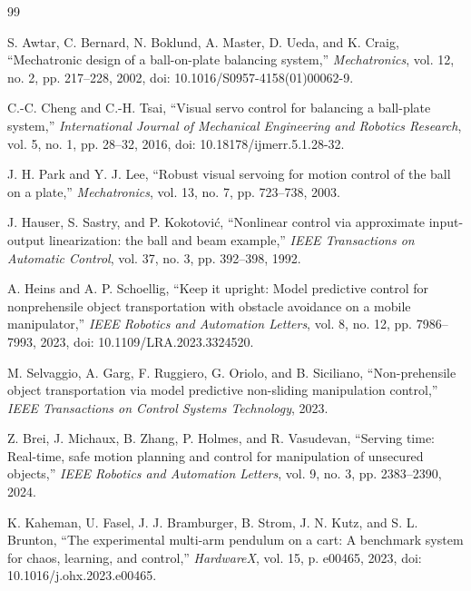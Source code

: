 \documentclass[11pt,letterpaper]{article}
\begin{document}
\begin{thebibliography}{99}

S. Awtar, C. Bernard, N. Boklund, A. Master, D. Ueda, and K. Craig,
``Mechatronic design of a ball-on-plate balancing system,''
\textit{Mechatronics}, vol. 12, no. 2, pp. 217--228, 2002,
doi: 10.1016/S0957-4158(01)00062-9.

C.-C. Cheng and C.-H. Tsai,
``Visual servo control for balancing a ball-plate system,''
\textit{International Journal of Mechanical Engineering and Robotics Research},
vol. 5, no. 1, pp. 28--32, 2016, doi: 10.18178/ijmerr.5.1.28-32.

J. H. Park and Y. J. Lee,
``Robust visual servoing for motion control of the ball on a plate,''
\textit{Mechatronics}, vol. 13, no. 7, pp. 723--738, 2003.

J. Hauser, S. Sastry, and P. Kokotovi\'c,
``Nonlinear control via approximate input-output linearization: the ball
and beam example,''
\textit{IEEE Transactions on Automatic Control}, vol. 37, no. 3,
pp. 392--398, 1992.

A. Heins and A. P. Schoellig,
``Keep it upright: Model predictive control for nonprehensile object
transportation with obstacle avoidance on a mobile manipulator,''
\textit{IEEE Robotics and Automation Letters}, vol. 8, no. 12,
pp. 7986--7993, 2023, doi: 10.1109/LRA.2023.3324520.

M. Selvaggio, A. Garg, F. Ruggiero, G. Oriolo, and B. Siciliano,
``Non-prehensile object transportation via model predictive
non-sliding manipulation control,''
\textit{IEEE Transactions on Control Systems Technology}, 2023.

Z. Brei, J. Michaux, B. Zhang, P. Holmes, and R. Vasudevan,
``Serving time: Real-time, safe motion planning and control for
manipulation of unsecured objects,''
\textit{IEEE Robotics and Automation Letters}, vol. 9, no. 3,
pp. 2383--2390, 2024.

K. Kaheman, U. Fasel, J. J. Bramburger, B. Strom, J. N. Kutz, and
S. L. Brunton,
``The experimental multi-arm pendulum on a cart: A benchmark system for
chaos, learning, and control,''
\textit{HardwareX}, vol. 15, p. e00465, 2023,
doi: 10.1016/j.ohx.2023.e00465.


\end{thebibliography}
\end{document}
